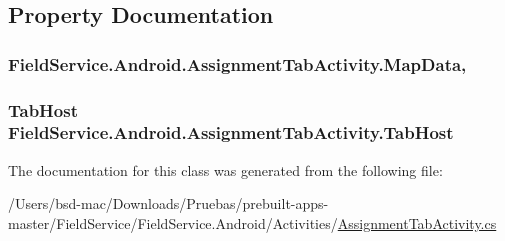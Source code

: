 \subsection{Property Documentation}
\hypertarget{class_field_service_1_1_android_1_1_assignment_tab_activity_a3e356c26ab2592fc60ad32d2cc5ac010}{
\subsubsection[{Map\+Data}]{ Field\+Service.\+Android.\+Assignment\+Tab\+Activity.\+Map\+Data\hspace{0.3cm}{\ttfamily [get]}, {\ttfamily [set]}}}\label{class_field_service_1_1_android_1_1_assignment_tab_activity_a3e356c26ab2592fc60ad32d2cc5ac010}
\hypertarget{class_field_service_1_1_android_1_1_assignment_tab_activity_a7ffe46f2a76590c548c545e11a375fcb}{
\subsubsection[{Tab\+Host}]{\setlength{\rightskip}{0pt plus 5cm}Tab\+Host Field\+Service.\+Android.\+Assignment\+Tab\+Activity.\+Tab\+Host\hspace{0.3cm}{\ttfamily [get]}}}\label{class_field_service_1_1_android_1_1_assignment_tab_activity_a7ffe46f2a76590c548c545e11a375fcb}


The documentation for this class was generated from the following file\+:\begin{DoxyCompactItemize}
\item 
/\+Users/bsd-\/mac/\+Downloads/\+Pruebas/prebuilt-\/apps-\/master/\+Field\+Service/\+Field\+Service.\+Android/\+Activities/\hyperlink{_assignment_tab_activity_8cs}{Assignment\+Tab\+Activity.\+cs}\end{DoxyCompactItemize}
